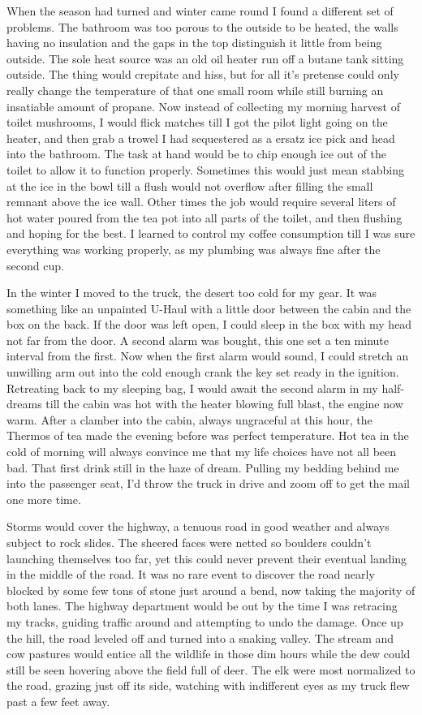 \documentclass[ebook, 10pt, openright, onecolumn]{memoir}
\begin{document}
When the season had turned and winter came round I found a different set of
problems.  The bathroom was too porous to the outside to be heated, the walls
having no insulation and the gaps in the top distinguish it little from being
outside. The sole heat source was an old oil heater run off a butane tank
sitting outside. The thing would crepitate and hiss, but for all it's pretense
could only really change the temperature of that one small room while still
burning an insatiable amount of propane.  Now instead of collecting my morning
harvest of toilet mushrooms, I would flick matches till I got the pilot light
going on the heater, and then grab a trowel I had sequestered as a ersatz ice
pick and head into the bathroom.  The task at hand would be to chip enough ice
out of the toilet to allow it to function properly.  Sometimes this would just
mean stabbing at the ice in the bowl till a flush would not overflow after
filling the small remnant above the ice wall. Other times the job would require
several liters of hot water poured from the tea pot into all parts of the
toilet, and then flushing and hoping for the best.  I learned to control my
coffee consumption till I was sure everything was working properly, as my
plumbing was always fine after the second cup. 

In the winter I moved to the truck, the desert too cold for my gear.  It was
something like an unpainted U-Haul with a little door between the cabin and the
box on the back.  If the door was left open, I could sleep in the box with my
head not far from the door.  A second alarm was bought, this one set a ten
minute interval from the first.  Now when the first alarm would sound, I could
stretch an unwilling arm out into the cold enough crank the key set ready in the
ignition.  Retreating back to my sleeping bag, I would await the second alarm in
my half-dreams till the cabin was hot with the heater blowing full blast, the
engine now warm.  After a clamber into the cabin, always ungraceful at this
hour, the Thermos of tea made the evening before was perfect temperature.  Hot
tea in the cold of morning will always convince me that my life choices have not
all been bad.  That first drink still in the haze of dream. 
Pulling my bedding behind me into the passenger seat, I'd throw the truck in
drive and zoom off to get the mail one more time. 

Storms would cover the highway, a tenuous road in good weather and always
subject to rock slides.  The sheered faces were netted so boulders couldn't
launching themselves too far, yet this could never prevent their eventual
landing in the middle of the road.  It was no rare event to discover the road
nearly blocked by some few tons of stone just around a bend, now taking the
majority of both lanes.  The highway department would be out by the time I was
retracing my tracks, guiding traffic around and attempting to undo the damage.
Once up the hill, the road leveled off and turned into a snaking valley.  The
stream and cow pastures would entice all the wildlife in those dim hours while
the dew could still be seen hovering above the field full of deer.  The elk were
most normalized to the road, grazing just off its side, watching with
indifferent eyes as my truck flew past a few feet away.
\end{document}
